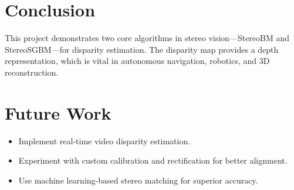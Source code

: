 \documentclass[12pt]{article}
\begin{document}
\section{Conclusion}
This project demonstrates two core algorithms in stereo vision—StereoBM and StereoSGBM—for disparity estimation. The disparity map provides a depth representation, which is vital in autonomous navigation, robotics, and 3D reconstruction.

\section{Future Work}
\begin{itemize}
    \item Implement real-time video disparity estimation.
    \item Experiment with custom calibration and rectification for better alignment.
    \item Use machine learning-based stereo matching for superior accuracy.
\end{itemize}
\end{document}

